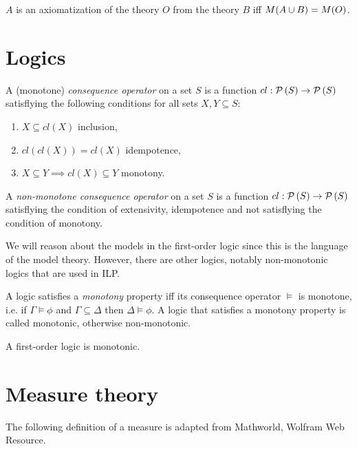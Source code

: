 \begin{defn}
$A$ is an axiomatization of the theory $O$ from the theory $B$ iff $M(A \cup B)=M(O)$.
\end{defn}

\section{Logics\cite{stanford2010}}
\begin{defn}
A (monotone) \emph{consequence operator}\cite{wikipedieClosureOperator} on a set $S$ is a function $cl:\mathcal{P} \left({ S }\right) \to \mathcal{P} \left({ S }\right)$ satisflying the following conditions for all sets $X, Y \subseteq S$:
\begin{enumerate}
\item $X \subseteq cl(X)$ inclusion,
\item $cl(cl(X))=cl(X)$ idempotence,
\item $X \subseteq{Y} \implies cl(X) \subseteq{Y}$ monotony.
\end{enumerate}
\end{defn}

\begin{defn}
A \emph{non-monotone consequence operator} on a set $S$ is a function
$cl:\mathcal{P} \left({ S }\right) \to \mathcal{P} \left({ S }\right)$ satisflying the condition of extensivity, idempotence and not satisflying the condition of monotony.
\end{defn}

We will reason about the models in the first-order logic since this is the language of the model theory. However, there are other logics, notably non-monotonic logics that are used in ILP.

\begin{defn}
A logic satisfies a \emph{monotony} property iff its consequence operator $\models$ is monotone, i.e.
if $\Gamma \models \phi$ and $\Gamma \subseteq \Delta$ then $\Delta \models \phi$. A logic that satisfies a monotony property is called monotonic, otherwise non-monotonic.
\end{defn}

\begin{exmp}
A first-order logic is monotonic.
\end{exmp}

\section{Measure theory}
The following definition of a measure is adapted from Mathworld, Wolfram Web Resource\cite{wolframMathworldMeasure}.

